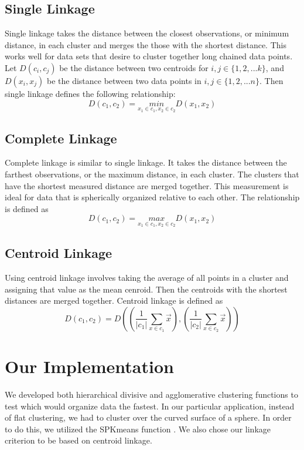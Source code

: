 \documentclass[../tech_report_1.tex]{subfiles}
\begin{document}
\subsection{Single Linkage}

Single linkage takes the distance between the closest observations,
or minimum distance, in each cluster and merges the those with the
shortest distance. This works well for data sets that desire to cluster
together long chained data points. Let $D(c_i,c_j)$ be the distance between two centroids for $i,j \in \{1, 2, ... k\}$, and $D(x_i, x_j)$ be the distance between two data points in $i, j \in \{ 1, 2, ... n \}$. Then single linkage defines the following relationship:
\[
D(c_{1},c_{2})=\underset{x_{1}\in c_{1},x_{2}\in c_{2}}{min}D(x_{1},x_{2})
\]



\subsection{Complete Linkage}

Complete linkage is similar to single linkage. It takes the distance
between the farthest observations, or the maximum distance, in each
cluster. The clusters that have the shortest measured distance are
merged together. This measurement is ideal for data that is spherically
organized relative to each other. The relationship is defined as
\[
D(c_{1},c_{2})=\underset{x_{1}\in c_{1},x_{2}\in c_{2}}{max}D(x_{1},x_{2})
\]



\subsection{Centroid Linkage}

Using centroid linkage involves taking the average of all points in
a cluster and assigning that value as the mean cenroid. Then
the centroids with the shortest distances are merged together.
Centroid linkage is defined as
\[
D(c_{1},c_{2})=D((\frac{1}{|c_{1}|}\sum_{x\in c_{1}}\overset{\rightarrow}{x}),(\frac{1}{|c_{2}|}\sum_{x\in c_{2}}\overset{\rightarrow}{x}))
\]



\section{Our Implementation}

We developed both hierarchical divisive and agglomerative clustering
functions to test which would organize data the fastest. In our particular
application, instead of flat clustering, we had to cluster over the
curved surface of a sphere. In order to do this, we utilized the SPKmeans
function \cite{nguyen_spherical_clustering}. We also chose our linkage criterion
to be based on centroid linkage.
\end{document}
